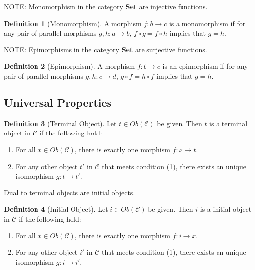 \documentclass{article}
\theoremstyle{definition}
\newtheorem{definition}{Definition}
\begin{document}
NOTE: Monomorphism in the category \textbf{Set} are injective functions.
\begin{definition}[Monomorphism]
    A morphism $f:b\rightarrow c$ is a monomorphism if for any pair of parallel morphisms $g,h:a\rightarrow b$, $f\circ g=f\circ h$ implies that $g=h$.
\end{definition}

NOTE: Epimorphisms in the category \textbf{Set} are surjective functions.
\begin{definition}[Epimorphism]
    A morphism $f:b\rightarrow c$ is an epimorphism if for any pair of parallel morphisms $g,h:c\rightarrow d$, $g\circ f=h\circ f$ implies that $g=h$.
\end{definition}

\subsection*{Universal Properties}

\begin{definition}[Terminal Object]
    Let $t\in Ob(\mathcal{C})$ be given. Then $t$ is a terminal object in $\mathcal{C}$ if the following hold:
    \begin{enumerate}
        \item For all $x\in Ob(\mathcal{C})$, there is exactly one morphism $f:x\rightarrow t$.
        \item For any other object $t'$ in $\mathcal{C}$ that meets condition (1), there exists an unique isomorphism $g:t\rightarrow t'$.
    \end{enumerate}
\end{definition}

Dual to terminal objects are initial objects.
\begin{definition}[Initial Object]
    Let $i\in Ob(\mathcal{C})$ be given. Then $i$ is a initial object in $\mathcal{C}$ if the following hold:
    \begin{enumerate}
        \item For all $x\in Ob(\mathcal{C})$, there is exactly one morphism $f:i\rightarrow x$.
        \item For any other object $i'$ in $\mathcal{C}$ that meets condition (1), there exists an unique isomorphism $g:i\rightarrow i'$.
    \end{enumerate}
\end{definition}
\end{document}
